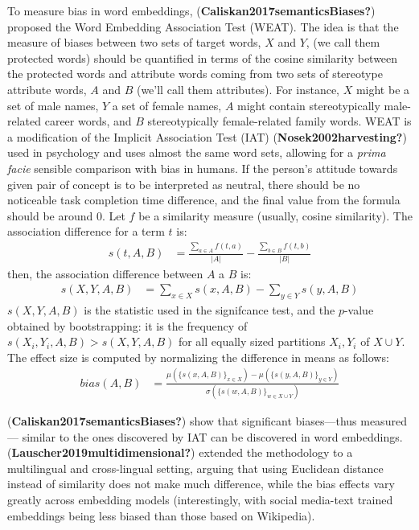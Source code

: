 \documentclass[
  10pt,
  dvipsnames,enabledeprecatedfontcommands]{scrartcl}
\begin{document}
To measure bias in word embeddings,
(\textbf{Caliskan2017semanticsBiases?}) proposed the Word Embedding
Association Test (WEAT). The idea is that the measure of biases between
two sets of target words, \(X\) and \(Y\), (we call them protected
words) should be quantified in terms of the cosine similarity between
the protected words and attribute words coming from two sets of
stereotype attribute words, \(A\) and \(B\) (we'll call them
attributes). For instance, \(X\) might be a set of male names, \(Y\) a
set of female names, \(A\) might contain stereotypically male-related
career words, and \(B\) stereotypically female-related family words.
WEAT is a modification of the Implicit Association Test (IAT)
(\textbf{Nosek2002harvesting?}) used in psychology and uses almost the
same word sets, allowing for a \emph{prima facie} sensible comparison
with bias in humans. If the person's attitude towards given pair of
concept is to be interpreted as neutral, there should be no noticeable
task completion time difference, and the final value from the formula
should be around 0. Let \(f\) be a similarity measure (usually, cosine
similarity). The association difference for a term \(t\) is:
\begin{align}
s(t,A,B) & = \frac{\sum_{a\in A}f(t,a)}{\vert A\vert} - \frac{\sum_{b\in B}f(t,b)}{\vert B\vert}
\end{align} \noindent then, the association difference between \(A\) a
\(B\) is: \begin{align}
s(X,Y,A,B) & = \sum_{x\in X} s(x,A,B) -  \sum_{y\in Y} s(y,A,B)
\end{align} \noindent \(s(X,Y,A,B)\) is the statistic used in the
signifcance test, and the \(p\)-value obtained by bootstrapping: it is
the frequency of \(s(X_i,Y_i,A,B)>s(X,Y,A,B)\) for all equally sized
partitions \(X_i, Y_i\) of \(X\cup Y\). The effect size is computed by
normalizing the difference in means as follows: \begin{align}
bias(A,B) & = \frac{
\mu(\{s(x,A,B)\}_{x\in X}) -\mu(\{s(y,A,B)\}_{y\in Y}) 
}{
\sigma(\{s(w,A,B)\}_{w\in X\cup Y})
}
\end{align}

(\textbf{Caliskan2017semanticsBiases?}) show that significant
biases---thus measured--- similar to the ones discovered by IAT can be
discovered in word embeddings. (\textbf{Lauscher2019multidimensional?})
extended the methodology to a multilingual and cross-lingual setting,
arguing that using Euclidean distance instead of similarity does not
make much difference, while the bias effects vary greatly across
embedding models (interestingly, with social media-text trained
embeddings being less biased than those based on Wikipedia).
\end{document}
